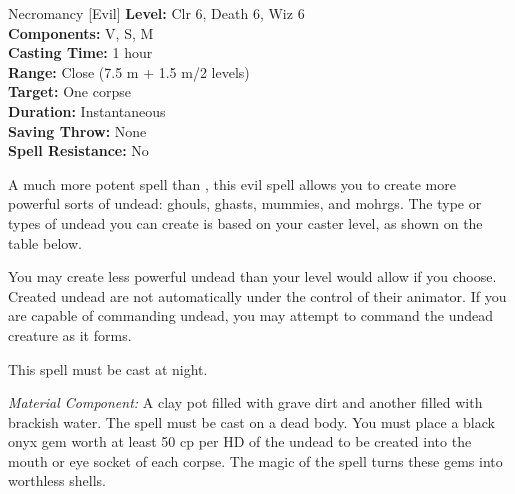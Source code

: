 {Necromancy [Evil]}
{
	\textbf{Level:}
	Clr 6, Death 6, Wiz 6\\
	\textbf{Components:}
	V, S, M\\
	\textbf{Casting Time:}
	1 hour\\
	\textbf{Range:}
	Close (7.5 m + 1.5 m/2 levels)\\
	\textbf{Target:}
	One corpse\\
	\textbf{Duration:}
	Instantaneous\\
	\textbf{Saving Throw:}
	None\\
	\textbf{Spell Resistance:}
	No\\
}
{
	A much more potent spell than , this evil spell allows you to create more powerful sorts of undead: ghouls, ghasts, mummies, and mohrgs. The type or types of undead you can create is based on your caster level, as shown on the table below.


	You may create less powerful undead than your level would allow if you choose. Created undead are not automatically under the control of their animator. If you are capable of commanding undead, you may attempt to command the undead creature as it forms.

	This spell must be cast at night.

	\textit{Material Component:}
	A clay pot filled with grave dirt and another filled with brackish water. The spell must be cast on a dead body. You must place a black onyx gem worth at least 50 cp per HD of the undead to be created into the mouth or eye socket of each corpse. The magic of the spell turns these gems into worthless shells.

}
